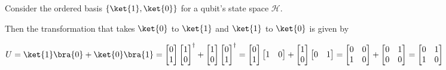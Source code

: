 \begin{eg}
    Consider the ordered basis $\{ \ket{1}, \ket{0} \}$ for a qubit's state space $\mathcal{H}$.

    Then the transformation that takes $\ket{0}$ to $\ket{1}$ and $\ket{1}$ to $\ket{0}$ is given by 

    $U = \ket{1}\bra{0} + \ket{0} \bra{1} = \begin{bmatrix} 0 \\ 1 \end{bmatrix} \begin{bmatrix} 1 \\ 0 \end{bmatrix}^\dagger + \begin{bmatrix} 1 \\ 0  \end{bmatrix} \begin{bmatrix} 0 \\ 1 \end{bmatrix}^\dagger = \begin{bmatrix} 0 \\ 1 \end{bmatrix} \begin{bmatrix} 1 & 0 \end{bmatrix} + \begin{bmatrix} 1 \\ 0 \end{bmatrix} \begin{bmatrix} 0 & 1 \end{bmatrix} = \begin{bmatrix} 0 & 0 \\ 1 & 0 \end{bmatrix} + \begin{bmatrix} 0 & 1 \\ 0 & 0 \end{bmatrix} = \begin{bmatrix} 0 & 1 \\ 1 & 0 \end{bmatrix}$
\end{eg}


